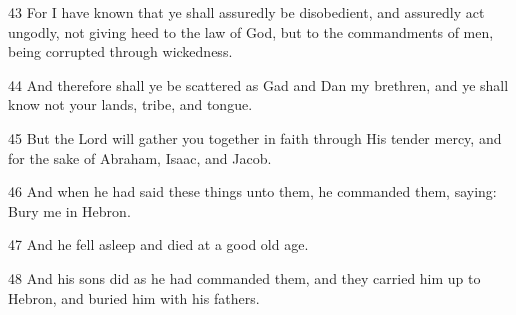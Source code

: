 \par 43 For I have known that ye shall assuredly be disobedient, and assuredly act ungodly, not giving heed to the law of God, but to the commandments of men, being corrupted through wickedness.

\par 44 And therefore shall ye be scattered as Gad and Dan my brethren, and ye shall know not your lands, tribe, and tongue.

\par 45 But the Lord will gather you together in faith through His tender mercy, and for the sake of Abraham, Isaac, and Jacob.

\par 46 And when he had said these things unto them, he commanded them, saying: Bury me in Hebron.

\par 47 And he fell asleep and died at a good old age.

\par 48 And his sons did as he had commanded them, and they carried him up to Hebron, and buried him with his fathers.

